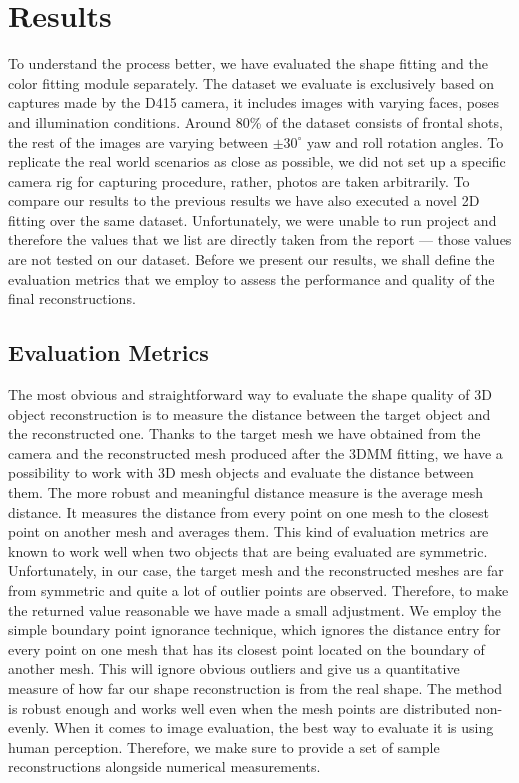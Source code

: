 \chapter{Results}\label{ch4}

To understand the process better, we have evaluated the shape fitting and the color fitting module separately. The dataset we evaluate is exclusively based on captures made by the D415 camera, it includes images with varying faces, poses and illumination conditions. Around 80\% of the dataset consists of frontal shots, the rest of the images are varying between $\pm 30^{\circ}$ yaw and roll rotation angles. To replicate the real world scenarios as close as possible, we did not set up a specific camera rig for capturing procedure, rather, photos are taken arbitrarily. To compare our results to the previous results we have also executed a novel 2D fitting  \cite{Schoenborn2017} over the same dataset. Unfortunately, we were unable to run \cite{betschard2016} project and therefore the values that we list are directly taken from the report — those values are not tested on our dataset. Before we present our results, we shall define the evaluation metrics that we employ to assess the performance and quality of the final reconstructions. 

\section{Evaluation Metrics}
The most obvious and straightforward way to evaluate the shape quality of 3D object reconstruction is to measure the distance between the target object and the reconstructed one. Thanks to the target mesh we have obtained from the camera and the reconstructed mesh produced after the 3DMM fitting, we have a possibility to work with 3D mesh objects and evaluate the distance between them. The more robust and meaningful distance measure is the average mesh distance. It measures the distance from every point on one mesh to the closest point on another mesh and averages them. This kind of evaluation metrics are known to work well when two objects that are being evaluated are symmetric. Unfortunately, in our case, the target mesh and the reconstructed meshes are far from symmetric and quite a lot of outlier points are observed. Therefore, to make the returned value reasonable we have made a small adjustment. We employ the simple boundary point ignorance technique, which ignores the distance entry for every point on one mesh that has its closest point located on the boundary of another mesh. This will ignore obvious outliers and give us a quantitative measure of how far our shape reconstruction is from the real shape. The method is robust enough and works well even when the mesh points are distributed non-evenly. When it comes to image evaluation, the best way to evaluate it is using human perception. Therefore, we make sure to provide a set of sample reconstructions alongside numerical measurements.

